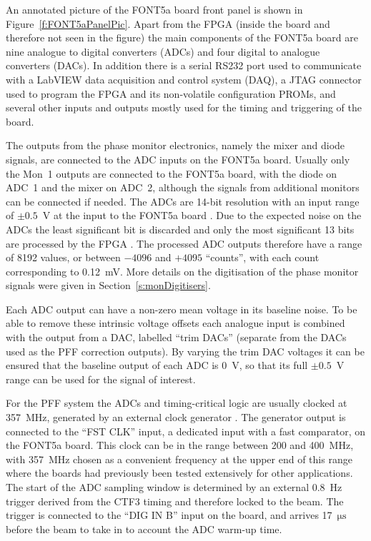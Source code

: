 An annotated picture of the FONT5a board front panel is shown in Figure~\ref{f:FONT5aPanelPic}. Apart from the FPGA (inside the board and therefore not seen in the figure) the main components of the FONT5a board are nine analogue to digital converters (ADCs) and four digital to analogue converters (DACs). In addition there is a serial RS232 port used to communicate with a LabVIEW data acquisition and control system (DAQ), a JTAG connector used to program the FPGA and its non-volatile configuration PROMs, and several other inputs and outputs mostly used for the timing and triggering of the board.

The outputs from the phase monitor electronics, namely the mixer and diode signals, are connected to the ADC inputs on the FONT5a board. Usually only the Mon~1 outputs are connected to the FONT5a board, with the diode on ADC~1 and the mixer on ADC~2, although the signals from additional monitors can be connected if needed. The ADCs are 14-bit resolution with an input range of \(\pm0.5\)~V at the input to the FONT5a board \cite{fontADCs}. Due to the expected noise on the ADCs the least significant bit is discarded and only the most significant 13 bits are processed by the FPGA \cite{fontPaper}. The processed ADC outputs therefore have a range of 8192 values, or between \(-4096\) and \(+4095\) ``counts'', with each count corresponding to 0.12~mV. More details on the digitisation of the phase monitor signals were given in Section~\ref{s:monDigitisers}. 

Each ADC output can have a non-zero mean voltage in its baseline noise. To be able to remove these intrinsic voltage offsets each analogue input is combined with the output from a DAC, labelled ``trim DACs'' (separate from the DACs used as the PFF correction outputs). By varying the trim DAC voltages it can be ensured that the baseline output of each ADC is 0~V, so that its full \(\pm0.5\)~V range can be used for the signal of interest.

For the PFF system the ADCs and timing-critical logic are usually clocked at 357~MHz, generated by an external clock generator \cite{srsClockGen}. The generator output is connected to the ``FST CLK'' input, a dedicated input with a fast comparator, on the FONT5a board. 
This clock can be in the range between 200 and 400~MHz, with 357~MHz chosen as a convenient frequency at the upper end of this range where the boards had previously been tested extensively for other applications.
The start of the ADC sampling window is determined by an external 0.8~Hz trigger derived from the CTF3 timing and therefore locked to the beam. The trigger is connected to the ``DIG IN B'' input on the board, and arrives 17~\(\mathrm{\mu s}\) before the beam to take in to account the ADC warm-up time.

